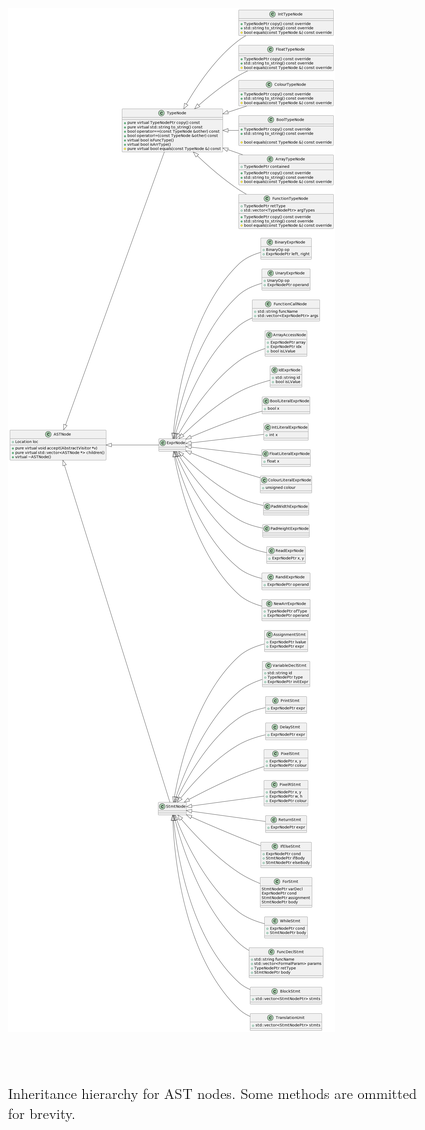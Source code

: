 \documentclass[11pt,a4paper]{scrartcl}
\begin{document}
\begin{figure}
  \centering
  \includegraphics[height=0.95\textheight]{ast_uml}
  \caption{Inheritance hierarchy for AST nodes. Some methods are ommitted for brevity.}~\label{fig:ast-hierarchy}
\end{figure}
\end{document}
